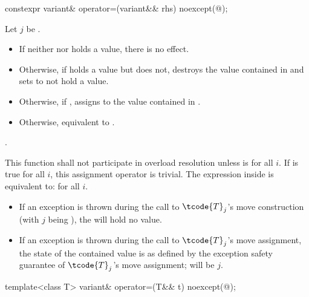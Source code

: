 %
\begin{itemdecl}
constexpr variant& operator=(variant&& rhs) noexcept(@\seebelow@);
\end{itemdecl}

\begin{itemdescr}
\pnum
Let $j$ be .

\pnum
\effects
\begin{itemize}
\item
If neither  nor  holds a value, there is no effect.
\item
Otherwise, if  holds a value but  does not, destroys the value
contained in  and sets  to not hold a value.
\item
Otherwise, if , assigns  to
the value contained in .
\item
Otherwise, equivalent to .
\end{itemize}

\pnum
\returns
{}.

\pnum
\remarks
This function shall not participate in overload resolution unless
 is
 for all $i$.
If 
is true for all $i$, this assignment operator is trivial.
The expression inside  is equivalent to:
 for all $i$.
\begin{itemize}
\item If an exception is thrown during the call to $\tcode{T}_j$'s move construction
(with $j$ being ), the  will hold no value.
\item If an exception is thrown during the call to $\tcode{T}_j$'s move assignment,
the state of the contained value is as defined by the exception safety
guarantee of $\tcode{T}_j$'s move assignment;  will be $j$.
\end{itemize}
\end{itemdescr}

%
\begin{itemdecl}
template<class T> variant& operator=(T&& t) noexcept(@\seebelow@);
\end{itemdecl}

